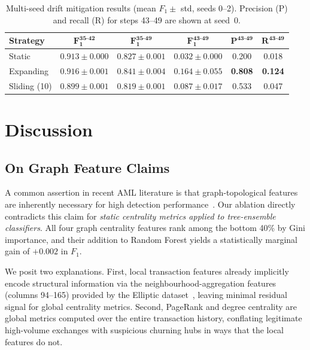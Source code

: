 \documentclass[conference]{IEEEtran}
\begin{document}
\begin{table}[t]
\centering
\caption{%
  Multi-seed drift mitigation results (mean $F_1 \pm$ std, seeds 0--2).
  Precision (P) and recall (R) for steps 43--49 are shown at seed~0.
}
\label{tab:drift}
\renewcommand{\arraystretch}{1.25}
\scriptsize
\begin{tabular}{@{}lccccc@{}}
\toprule
\textbf{Strategy}
  & $\boldsymbol{F_1^{35\text{-}42}}$
  & $\boldsymbol{F_1^{35\text{-}49}}$
  & $\boldsymbol{F_1^{43\text{-}49}}$
  & $\boldsymbol{P^{43\text{-}49}}$
  & $\boldsymbol{R^{43\text{-}49}}$ \\
\midrule
Static       & $0.913{\pm}0.000$ & $0.827{\pm}0.001$ & $0.032{\pm}0.000$ & 0.200 & 0.018 \\
Expanding    & $\mathbf{0.916{\pm}0.001}$ & $\mathbf{0.841{\pm}0.004}$ & $\mathbf{0.164{\pm}0.055}$ & \textbf{0.808} & \textbf{0.124} \\
Sliding (10) & $0.899{\pm}0.001$ & $0.819{\pm}0.001$ & $0.087{\pm}0.017$ & 0.533 & 0.047 \\
\bottomrule
\end{tabular}
\end{table}

\section{Discussion}
\label{sec:discussion}

\subsection{On Graph Feature Claims}

A common assertion in recent AML literature is that graph-topological
features are inherently necessary for high detection
performance~\cite{guo2023lb, lin2026wavelet, han2026featuregated}.
Our ablation directly contradicts this claim for \emph{static centrality
metrics applied to tree-ensemble classifiers}.
All four graph centrality features rank among the bottom 40\% by Gini
importance, and their addition to Random Forest yields a statistically
marginal gain of $+0.002$ in $F_1$.

We posit two explanations.
First, local transaction features already implicitly encode structural
information via the neighbourhood-aggregation features (columns 94--165)
provided by the Elliptic dataset~\cite{weber2019anti}, leaving minimal
residual signal for global centrality metrics.
Second, PageRank and degree centrality are global metrics computed over
the entire transaction history, conflating legitimate high-volume exchanges
with suspicious churning hubs in ways that the local features do not.
\end{document}
